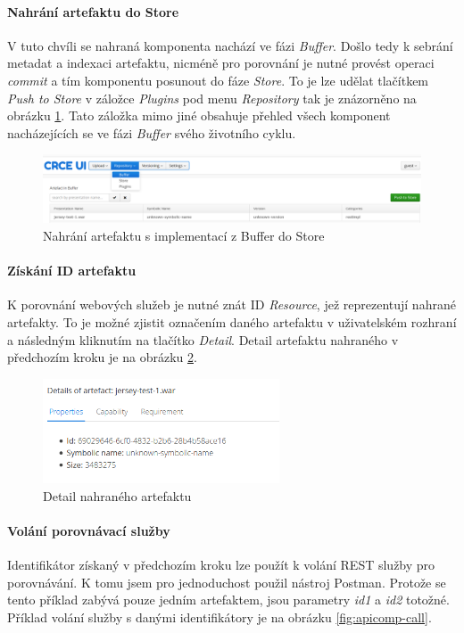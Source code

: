 \documentclass[czech,DP]{thesiskiv}
\begin{document}
\paragraph{Nahrání artefaktu do Store}
V tuto chvíli se nahraná komponenta nachází ve fázi \textit{Buffer}. Došlo tedy k sebrání metadat a indexaci artefaktu, nicméně pro porovnání je nutné provést operaci \textit{commit} a tím komponentu posunout do fáze \textit{Store}. To je lze udělat tlačítkem \textit{Push to Store} v záložce \textit{Plugins} pod menu \textit{Repository} tak je znázorněno na obrázku \ref{fig:crce-art-push-to-store}. Tato záložka mimo jiné obsahuje přehled všech komponent nacházejících se ve fázi \textit{Buffer} svého životního cyklu.

\begin{figure}[h]
	\centering
	\includegraphics[width=\linewidth]{crce-art-push-to-store.png}
	\caption{Nahrání artefaktu s implementací z Buffer do Store}
	\label{fig:crce-art-push-to-store}
\end{figure}

\paragraph{Získání ID artefaktu}
K porovnání webových služeb je nutné znát ID \textit{Resource}, jež reprezentují nahrané artefakty. To je možné zjistit označením daného artefaktu v uživatelském rozhraní a následným kliknutím na tlačítko \textit{Detail}. Detail artefaktu nahraného v předchozím kroku je na obrázku \ref{fig:crce-art-detail}.

\begin{figure}[h]
	\centering
	\includegraphics[width=7cm]{crce-art-detail.png}
	\caption{Detail nahraného artefaktu}
	\label{fig:crce-art-detail}
\end{figure}

\paragraph{Volání porovnávací služby}
Identifikátor získaný v předchozím kroku lze použít k volání REST služby pro porovnávání. K tomu jsem pro jednoduchost použil nástroj Postman. Protože se tento příklad zabývá pouze jedním artefaktem, jsou parametry \textit{id1} a \textit{id2} totožné. Příklad volání služby s danými identifikátory je na obrázku \ref{fig:apicomp-call}.
\end{document}
